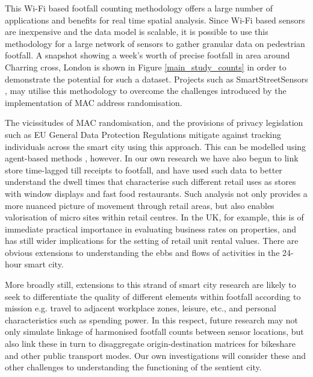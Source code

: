 This Wi-Fi based footfall counting methodology offers a large number of
applications and benefits for real time spatial analysis. Since Wi-Fi based
sensors are inexpensive and the data model is scalable, it is possible to use
this methodology for a large network of sensors to gather granular data on
pedestrian footfall. A snapshot showing a week’s worth of precise footfall in
area around Charring cross, London is shown in Figure \ref{main_study_counts} in
order to demonstrate the potential for such a dataset. Projects such as
SmartStreetSensors \citep{cdrc2018consumer}, may utilise this methodology to
overcome the challenges introduced by the implementation of MAC address
randomisation.

The vicissitudes of MAC randomisation, and the provisions of privacy legislation
such as EU General Data Protection Regulations mitigate against tracking
individuals across the smart city using this approach.  This can be modelled
using agent-based methods \citep{heppenstall2011agent}, however. In our own
research we have also begun to link store time-lagged till receipts to footfall,
and have used such data to better understand the dwell times that characterise
such different retail uses as stores with window displays and fast food
restaurants.  Such analysis not only provides a more nuanced picture of movement
through retail areas, but also enables valorisation of micro sites within retail
centres. In the UK, for example, this is of immediate practical importance in
evaluating business rates on properties, and has still wider implications for
the setting of retail unit rental values. There are obvious extensions to
understanding the ebbs and flows of activities in the 24-hour smart city.

More broadly still, extensions to this strand of smart city research are likely
to seek to differentiate the quality of different elements within footfall
according to mission e.g. travel to adjacent workplace zones, leisure, etc., and
personal characteristics such as spending power. In this respect, future
research may not only simulate linkage of harmonised footfall counts between
sensor locations, but also link these in turn to disaggregate origin-destination
matrices for bikeshare and other public transport modes.  Our own investigations
will consider these and other challenges to understanding the functioning of the
sentient city.
